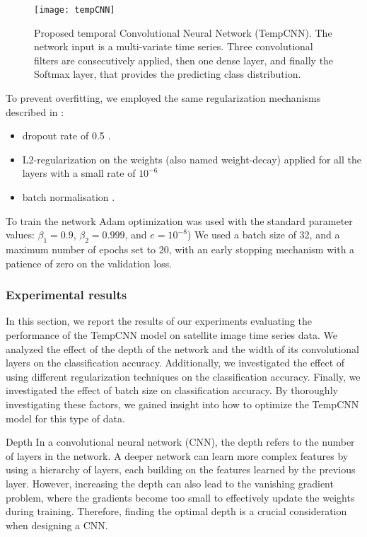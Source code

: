 \begin{figure}[!htbp]
  \centering
  \texttt{[image: tempCNN]}
  \caption{Proposed temporal Convolutional Neural Network (TempCNN). The network input is a
  multi-variate time series. Three convolutional filters are consecutively applied, then one dense layer,
  and finally the Softmax layer, that provides the predicting class distribution.    \cite{tempCNN}}
  \label{tab:temCNNArchitecture}
\end{figure}


To prevent overfitting, we employed the same regularization mechanisms described in \cite{tempCNN}:

\begin{itemize}
  \item dropout rate of 0.5 \cite{JMLR:v15:srivastava14a}. 
  \item L2-regularization on the weights (also named weight-decay) applied for all the layers with a small rate of $10^{-6}$ 
  \item batch normalisation \cite{DBLP:journals/corr/IoffeS15}.
\end{itemize}

To train the network Adam optimization was used with the standard parameter values: $\beta_1 = 0.9$, $\beta_2 = 0.999$, and $e = 10^{-8}$) \cite{kingma2014adam} 
We used a batch size of 32, and a maximum number of epochs set to 20, with an early stopping mechanism with a patience of zero on the validation loss. 


\subsubsection{Experimental results}

In this section, we report the results of our experiments evaluating the performance of the TempCNN model on satellite image time series data.
We analyzed the effect of the depth of the network and the width of its convolutional layers on the classification accuracy.
Additionally, we investigated the effect of using different regularization techniques on the classification accuracy.
Finally, we investigated the effect of batch size on classification accuracy. 
By thoroughly investigating these factors, we gained insight into how to optimize the TempCNN model for this type of data.


\begin{paragraph}{Depth}
In a convolutional neural network (CNN), the depth refers to the number of layers in the network.
A deeper network can learn more complex features by using a hierarchy of layers, each building on the features learned by the previous layer.
However, increasing the depth can also lead to the vanishing gradient problem, where the gradients become too small to effectively update the weights during training.
Therefore, finding the optimal depth is a crucial consideration when designing a CNN.
\end{paragraph}

